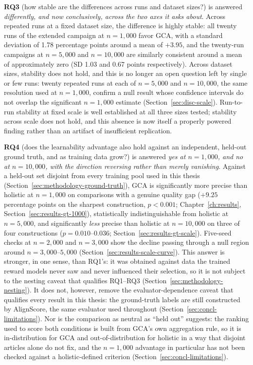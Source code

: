\textbf{RQ3} (how stable are the differences across runs and dataset sizes?) is
answered \emph{differently, and now conclusively, across the two axes it asks
about}. Across repeated runs at a fixed dataset size, the difference is highly
stable: all twenty runs of the extended campaign at $n=1{,}000$ favor GCA, with
a standard deviation of 1.78 percentage points around a mean of $+3.95$, and the
twenty-run campaigns at $n=5{,}000$ and $n=10{,}000$ are similarly consistent
around a mean of approximately zero (SD 1.03 and 0.67 points respectively).
Across dataset sizes, stability does not hold, and this is no longer an open
question left by single or few runs: twenty repeated runs at each of
$n=5{,}000$ and $n=10{,}000$, the same resolution used at $n=1{,}000$, confirm a
null result whose confidence intervals do not overlap the significant
$n=1{,}000$ estimate (Section~\ref{sec:disc-scale}). Run-to-run stability at
fixed scale is well established at all three sizes tested; stability across
scale does not hold, and this absence is now itself a properly powered
finding rather than an artifact of insufficient replication.

\textbf{RQ4} (does the learnability advantage also hold against an
independent, held-out ground truth, and as training data grow?) is answered
\emph{yes at $n=1{,}000$, and no at $n=10{,}000$, with the direction reversing
rather than merely vanishing}. Against a held-out set disjoint
from every training pool used in this thesis
(Section~\ref{sec:methodology-ground-truth}), GCA is significantly more
precise than holistic at $n=1{,}000$ on comparisons with a genuine quality
gap ($+9.25$ percentage points on the sharpest construction, $p<0.001$;
Chapter~\ref{ch:results}, Section~\ref{sec:results-gt-1000}), statistically
indistinguishable from holistic at $n=5{,}000$, and significantly
\emph{less} precise than holistic at $n=10{,}000$ on three of four
constructions ($p=0.010$--$0.036$; Section~\ref{sec:results-gt-scale}).
Five-seed checks at $n=2{,}000$ and $n=3{,}000$ show the decline passing
through a null region around $n=3{,}000$--$5{,}000$
(Section~\ref{sec:results-scale-curve}). This
answer is stronger, in one sense, than RQ1's: it was obtained against data
the trained reward models never saw and never influenced their selection,
so it is not subject to the nesting caveat that qualifies RQ1--RQ3
(Section~\ref{sec:methodology-nesting}). It does not, however, remove the
evaluator-dependence caveat that qualifies every result in this thesis: the
ground-truth labels are still constructed by AlignScore, the same evaluator
used throughout (Section~\ref{sec:concl-limitations}). Nor is the
comparison as neutral as ``held out'' suggests: the ranking used to score
both conditions is built from GCA's own aggregation rule, so it is
in-distribution for GCA and out-of-distribution for holistic in a way that
disjoint articles alone do not fix, and the $n=1{,}000$ advantage in
particular has not been checked against a holistic-defined criterion
(Section~\ref{sec:concl-limitations}).

